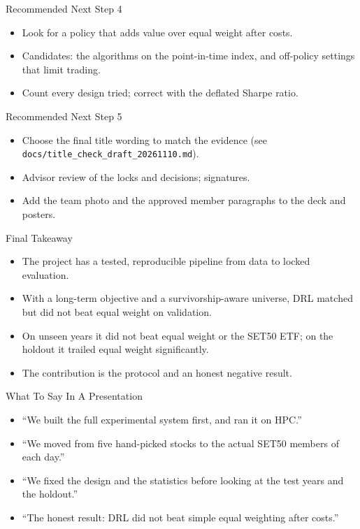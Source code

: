 \documentclass[aspectratio=43,10pt]{beamer}
\begin{document}
\begin{frame}{Recommended Next Step 4}
\begin{itemize}
  \item Look for a policy that adds value over equal weight after costs.
  \item Candidates: the algorithms on the point-in-time index, and off-policy settings that limit trading.
  \item Count every design tried; correct with the deflated Sharpe ratio.
\end{itemize}
\end{frame}

\begin{frame}{Recommended Next Step 5}
\begin{itemize}
  \item Choose the final title wording to match the evidence (see \texttt{docs/title\_check\_draft\_20261110.md}).
  \item Advisor review of the locks and decisions; signatures.
  \item Add the team photo and the approved member paragraphs to the deck and posters.
\end{itemize}
\end{frame}

\begin{frame}{Final Takeaway}
\begin{itemize}
  \item The project has a tested, reproducible pipeline from data to locked evaluation.
  \item With a long-term objective and a survivorship-aware universe, DRL matched but did not beat equal weight on validation.
  \item On unseen years it did not beat equal weight or the SET50 ETF; on the holdout it trailed equal weight significantly.
  \item The contribution is the protocol and an honest negative result.
\end{itemize}
\end{frame}

\begin{frame}{What To Say In A Presentation}
\begin{itemize}
  \item ``We built the full experimental system first, and ran it on HPC.''
  \item ``We moved from five hand-picked stocks to the actual SET50 members of each day.''
  \item ``We fixed the design and the statistics before looking at the test years and the holdout.''
  \item ``The honest result: DRL did not beat simple equal weighting after costs.''
\end{itemize}
\end{frame}
\end{document}
